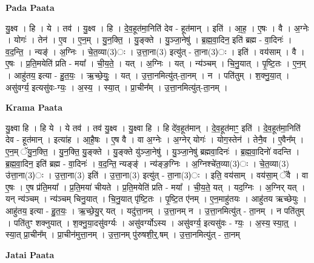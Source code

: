 \documentclass[17pt]{extarticle}
\begin{document}
\textbf{Pada Paata} \newline

यु॒क्ष्व । हि । ये । तव॑ । यु॒क्ष्व । हि । दे॒व॒हूत॑मा॒निति॑ देव - हूत॑मान् । इति॑ । आ॒ह॒ । ए॒षः । वै । अ॒ग्नेः । योगः॑ । तेन॑ । ए॒व । ए॒न॒म् । यु॒न॒क्ति॒ । यु॒ङ्क्ते । यु॒ञ्जा॒नेषु॑ । ब्र॒ह्म॒वा॒दिन॒ इति॑ ब्रह्म - वा॒दिनः॑ । व॒द॒न्ति॒ । न्यङ्॑ । अ॒ग्निः । चे॒त॒व्या(3)ः । उ॒त्ता॒ना(3) इत्यु॑त् - ता॒ना(3)ः । इति॑ । वय॑साम् । वै । ए॒षः । प्र॒ति॒मयेति॑ प्रति - मया᳚ । ची॒य॒ते॒ । यत् । अ॒ग्निः । यत् । न्य॑ञ्चम् । चि॒नु॒यात् । पृ॒ष्टि॒तः । ए॒न॒म् । आहु॑तय॒ इत्या - हु॒त॒यः॒ । ऋ॒च्छे॒युः॒ । यत् । उ॒त्ता॒नमित्यु॑त्-ता॒नम् । न । पति॑तुम् । श॒क्नु॒या॒त् । असु॑वर्ग्य॒ इत्यसु॑वः-ग्यः॒ । अ॒स्य॒ । स्या॒त् । प्रा॒चीन᳚म् । उ॒त्ता॒नमित्यु॑त्-ता॒नम् ।  \newline


\textbf{Krama Paata} \newline

यु॒क्ष्वा हि । हि ये । ये तव॑ । तव॑ यु॒क्ष्व । यु॒क्ष्वा हि । हि दे॑व॒हूत॑मान् । दे॒व॒हूत॑माꣳ॒॒ इति॑ । दे॒व॒हूत॑मा॒निति॑ देव - हूत॑मान् । इत्या॑ह । आ॒है॒षः । ए॒ष वै । वा अ॒ग्नेः । अ॒ग्नेर् योगः॑ । योग॒स्तेन॑ । तेनै॒व । ए॒वैन᳚म् । ए॒न॒म् ॅयु॒न॒क्ति॒ । यु॒न॒क्ति॒ यु॒ङ्क्ते । यु॒ङ्क्ते यु॑ञ्जा॒नेषु॑ । यु॒ञ्जा॒नेषु॑ ब्रह्मवा॒दिनः॑ । ब्र॒ह्म॒वा॒दिनो॑ वदन्ति । ब्र॒ह्म॒वा॒दिन॒ इति॑ ब्रह्म - वा॒दिनः॑ । व॒द॒न्ति॒ न्यङ्ङ्॑ । न्य॑ङ्ङ॒ग्निः । अ॒ग्निश्चे॑त॒व्या(3)ः । चे॒त॒व्या(3) उ॑त्ता॒ना(3)ः । उ॒त्ता॒ना(3) इति॑ । उ॒त्ता॒ना(3) इत्यु॑त् - ता॒ना(3)ः । इति॒ वय॑साम् । वय॑सा॒म् ॅवै । वा ए॒षः । ए॒ष प्र॑ति॒मया᳚ । प्र॒ति॒मया॑ चीयते । प्र॒ति॒मयेति॑ प्रति - मया᳚ । ची॒य॒ते॒ यत् । यद॒ग्निः । अ॒ग्निर् यत् । यन् न्य॑ञ्चम् । न्य॑ञ्चम् चिनु॒यात् । चि॒नु॒यात् पृ॑ष्टि॒तः । पृ॒ष्टि॒त ए॑नम् । ए॒न॒माहु॑तयः । आहु॑तय ऋच्छेयुः । आहु॑तय॒ इत्या - हु॒त॒यः॒ । ऋ॒च्छे॒यु॒र् यत् । यदु॑त्ता॒नम् । उ॒त्ता॒नम् न । उ॒त्ता॒नमित्यु॑त् - ता॒नम् । न पति॑तुम् । पति॑तुꣳ शक्नुयात् । श॒क्नु॒या॒दसु॑वर्ग्यः । असु॑वर्ग्योऽस्य । असु॑वर्ग्य॒ इत्यसु॑वः - ग्यः॒ । अ॒स्य॒ स्या॒त्॒ । स्या॒त् प्रा॒चीन᳚म् । प्रा॒चीन॑मुत्ता॒नम् । उ॒त्ता॒नम् पु॑रुषशी॒र्॒.षम् । उ॒त्ता॒नमित्यु॑त् - ता॒नम् \newline

\textbf{Jatai Paata} \newline
\end{document}
